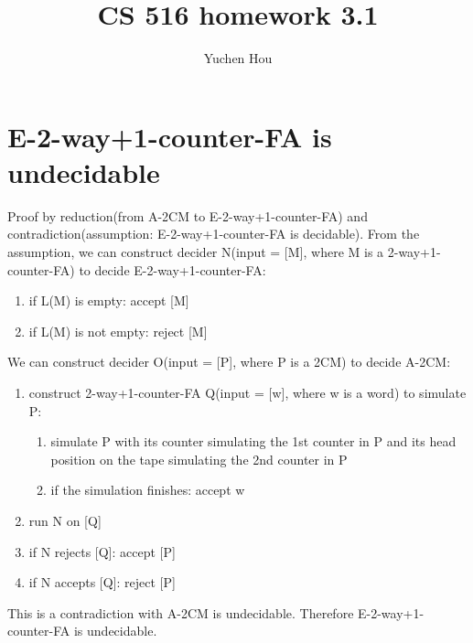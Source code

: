 \documentclass{article}
\begin{document}
\lstset{language=python, tabsize=4}
\title{CS 516 homework 3.1}
\author{Yuchen Hou}
\maketitle

\section{E-2-way+1-counter-FA is undecidable}
Proof by reduction(from A-2CM to E-2-way+1-counter-FA) and contradiction(assumption: E-2-way+1-counter-FA is decidable). From the assumption, we can construct decider N(input = [M], where M is a 2-way+1-counter-FA) to decide E-2-way+1-counter-FA:
\begin{enumerate}
	\item if L(M) is empty: accept [M]
	\item if L(M) is not empty: reject [M]
\end{enumerate}
We can construct decider O(input = [P], where P is a 2CM) to decide A-2CM:
\begin{enumerate}
	\item construct 2-way+1-counter-FA Q(input = [w], where w is a word) to simulate P:
	\begin{enumerate}
		\item simulate P with its counter simulating the 1st counter in P and its head position on the tape simulating the 2nd counter in P
		\item if the simulation finishes: accept w
	\end{enumerate}
	\item run N on [Q]
	\item if N rejects [Q]: accept [P]
	\item if N accepts [Q]: reject [P]
\end{enumerate}
This is a contradiction with A-2CM is undecidable. Therefore E-2-way+1-counter-FA is undecidable.
\end{document}
